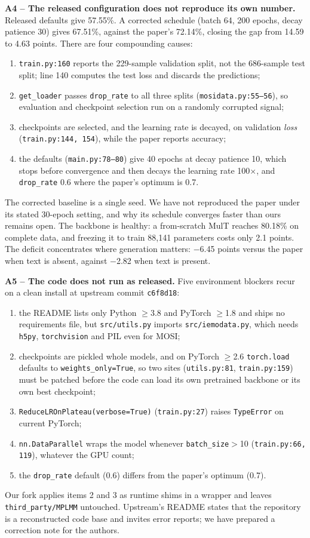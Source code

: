 \documentclass[lettersize,journal]{IEEEtran}
\begin{document}
\textbf{A4 -- The released configuration does not reproduce its own number.} Released defaults give 57.55\%. A corrected schedule (batch 64, 200 epochs, decay patience 30) gives 67.51\%, against the paper's 72.14\%, closing the gap from 14.59 to 4.63 points. There are four compounding causes:
\begin{enumerate}
\item \texttt{train.py:160} reports the 229-sample validation split, not the 686-sample test split; line 140 computes the test loss and discards the predictions;
\item \texttt{get\_loader} passes \texttt{drop\_rate} to all three splits (\texttt{mosidata.py:55--56}), so evaluation and checkpoint selection run on a randomly corrupted signal;
\item checkpoints are selected, and the learning rate is decayed, on validation \emph{loss} (\texttt{train.py:144, 154}), while the paper reports accuracy;
\item the defaults (\texttt{main.py:78--80}) give 40 epochs at decay patience 10, which stops before convergence and then decays the learning rate 100$\times$, and \texttt{drop\_rate} 0.6 where the paper's optimum is 0.7.
\end{enumerate}
The corrected baseline is a single seed. We have not reproduced the paper under its stated 30-epoch setting, and why its schedule converges faster than ours remains open.
The backbone is healthy: a from-scratch MulT reaches 80.18\% on complete data, and freezing it to train 88,141 parameters costs only 2.1 points. The deficit concentrates where generation matters: $-$6.45 points versus the paper when text is absent, against $-$2.82 when text is present.

\textbf{A5 -- The code does not run as released.} Five environment blockers recur on a clean install at upstream commit \texttt{c6f8d18}:
\begin{enumerate}
\item the README lists only Python $\ge$3.8 and PyTorch $\ge$1.8 and ships no requirements file, but \texttt{src/utils.py} imports \texttt{src/iemodata.py}, which needs \texttt{h5py}, \texttt{torchvision} and PIL even for MOSI;
\item checkpoints are pickled whole models, and on PyTorch $\ge$2.6 \texttt{torch.load} defaults to \texttt{weights\_only=True}, so two sites (\texttt{utils.py:81}, \texttt{train.py:159}) must be patched before the code can load its own pretrained backbone or its own best checkpoint;
\item \texttt{ReduceLROnPlateau(verbose=True)} (\texttt{train.py:27}) raises \texttt{TypeError} on current PyTorch;
\item \texttt{nn.DataParallel} wraps the model whenever \texttt{batch\_size}$>$10 (\texttt{train.py:66, 119}), whatever the GPU count;
\item the \texttt{drop\_rate} default (0.6) differs from the paper's optimum (0.7).
\end{enumerate}
Our fork applies items 2 and 3 as runtime shims in a wrapper and leaves \texttt{third\_party/MPLMM} untouched. Upstream's README states that the repository is a reconstructed code base and invites error reports; we have prepared a correction note for the authors.
\end{document}
